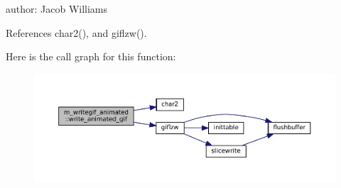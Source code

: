 author\+: Jacob Williams 



References char2(), and giflzw().

Here is the call graph for this function\+:\nopagebreak
\begin{figure}[H]
\begin{center}
\leavevmode
\includegraphics[width=350pt]{namespacem__writegif__animated_a3da6a5c71a9d9e1f49aa075adc6629bd_cgraph}
\end{center}
\end{figure}
